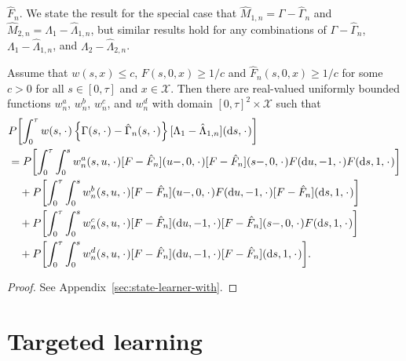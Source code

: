 \( \hat{F}_n \). We state the result for the special case that
\(\hat{M}_{1,n}= \Gamma-\hat{\Gamma}_n \) and
\(\hat{M}_{2,n} =\Lambda_1-\hat{\Lambda}_{1,n} \), but similar results hold for
any combinations of \( \Gamma-\hat{\Gamma}_n\),
\( \Lambda_1-\hat{\Lambda}_{1,n} \), and \( \Lambda_2-\hat{\Lambda}_{2,n} \).
\begin{proposition}
  \label{prop:dr-structure}
  Assume that \( w(s,x)\leq c \), \( F(s, 0, x) \geq 1/c \) and
  \( \hat{F}_n(s, 0, x) \geq 1/c \) for some \( c>0 \) for all
  \( s \in [0, \tau] \) and \( x \in \mathcal{X} \). Then there are real-valued
  uniformly bounded functions \( w^a_n \), \( w^b_n \), \( w^c_n \), and
  \( w^d_n \) with domain \( [0,\tau]^2 \times \mathcal{X} \) such that
  \begin{align*}
    & P{\left[
      \int_0^{\tau} w(s, \blank)
      \left\{
      \Gamma(s,\blank) -\hat{\Gamma}_n(s,\blank)
      \right\}
      [\Lambda_1-\hat{\Lambda}_{1,n}]
      (\diff s, \blank)
      \right]}
    \\
     & =
      P{\left[
      \int_0^{\tau} \int_0^{s} w^a_n(s,u,\blank) [F - \hat{F}_n](u-, 0, \blank)[F - \hat{F}_n](s-, 0, \blank) F(\diff u, -1, \blank ) F ( \diff s, 1, \blank)
      \right]}
    \\
    & \quad +
      P{\left[
      \int_0^{\tau} \int_0^{s} w^b_n(s,u,\blank) [F - \hat{F}_n](u-, 0, \blank)
      F(\diff u, -1, \blank ) [F - \hat{F}_n](\diff s, 1, \blank)
      \right]}
    \\
    & \quad +
      P{\left[
      \int_0^{\tau} \int_0^{s} w^c_n(s,u,\blank) [F - \hat{F}_n](\diff u, -1, \blank)
      [F - \hat{F}_n](s-, 0, \blank)
      F(\diff s, 1, \blank ) 
      \right]}
    \\
    & \quad +
      P{\left[
      \int_0^{\tau} \int_0^{s} w^d_n(s,u,\blank) [F - \hat{F}_n](\diff u, -1, \blank)
      [F - \hat{F}_n](\diff s, 1, \blank)
      \right]}.
  \end{align*}
\end{proposition}
\begin{proof}
  See Appendix~\ref{sec:state-learner-with}.
\end{proof}

\section{Targeted learning}
\label{sec:targeted-learning}

